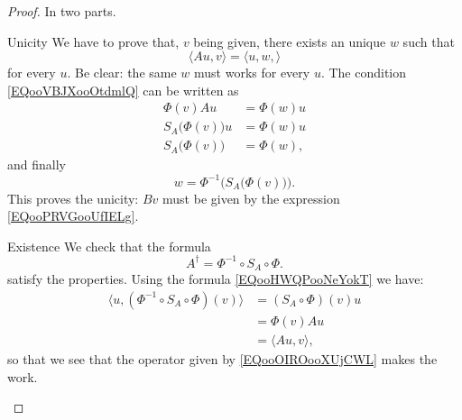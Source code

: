 \begin{proof}
    In two parts.
    \begin{subproof}
        \item[Unicity]
            We have to prove that, \( v\) being given, there exists an unique \( w\) such that
            \begin{equation}        \label{EQooVBJXooOtdmlQ}
                \langle Au, v\rangle =\langle u,w, \rangle 
            \end{equation}
            for every \( u\). Be clear: the same \( w\) must works for every \( u\). The condition \eqref{EQooVBJXooOtdmlQ} can be written as
            \begin{subequations}
                \begin{align}
                    \Phi(v)Au&=\Phi(w)u\\
                    S_A\big( \Phi(v) \big)u&=\Phi(w)u\\
                    S_A\big( \Phi(v) \big)&=\Phi(w),
                \end{align}
            \end{subequations}
            and finally
            \begin{equation}
                    w=\Phi^{-1}\Big( S_A\big( \Phi(v) \big) \Big).      \label{EQooPRVGooUfIELg}
            \end{equation}
            This proves the unicity: \( Bv\) must be given by the expression \eqref{EQooPRVGooUfIELg}.
        \item[Existence]
            We check that the formula
            \begin{equation}        \label{EQooOIROooXUjCWL}
                A^{\dag}=\Phi^{-1}\circ S_A\circ \Phi.
            \end{equation}
            satisfy the properties. Using the formula \eqref{EQooHWQPooNeYokT} we have:
            \begin{subequations}
                \begin{align}
                    \langle u, (\Phi^{-1}\circ S_A\circ \Phi)(v)\rangle &=(S_A\circ\Phi)(v)u\\
                    &=\Phi(v)Au\\
                    &=\langle Au, v\rangle ,
                \end{align}
            \end{subequations}
            so that we see that the operator given by \eqref{EQooOIROooXUjCWL} makes the work.
    \end{subproof}
\end{proof}

